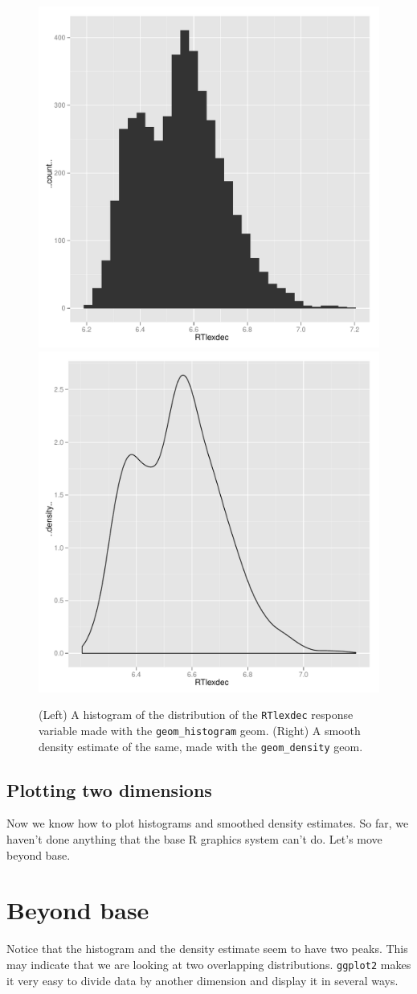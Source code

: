 \documentclass[oneside,10pt]{article}
\begin{document}
\begin{figure}[htbp]
  \includegraphics[width = 0.5\linewidth]{histogram}%
  \includegraphics[width = 0.5\linewidth]{density}
  \caption{(Left) A histogram of the distribution of the \texttt{RTlexdec} response variable made with the \texttt{geom\_histogram} geom. (Right) A smooth density estimate of the same, made with the \texttt{geom\_density} geom.}
  \label{fig:one}
\end{figure}

\subsection{Plotting two dimensions}

Now we know how to plot histograms and smoothed density estimates. So far, we haven't done anything that the base R graphics system can't do. Let's move beyond base.

\newpage
\section{Beyond base}

Notice that the histogram and the density estimate seem to have two peaks. This may indicate that we are looking at two overlapping distributions. \verb!ggplot2! makes it very easy to divide data by another dimension and display it in several ways.
\end{document}

